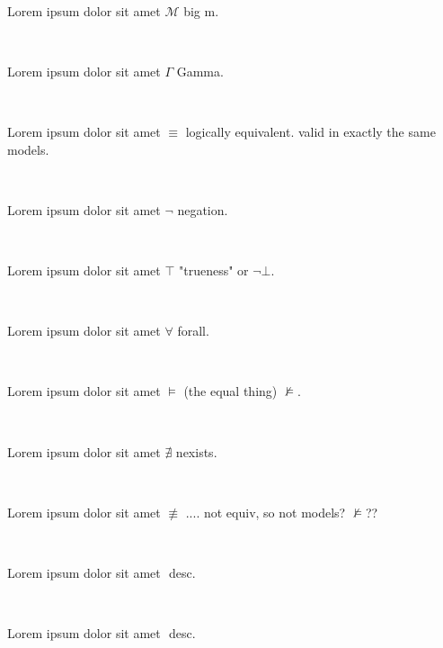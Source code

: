 \documentclass[12pt]{article}
\begin{document}
\centerline{~}

Lorem ipsum dolor sit amet $ \mathcal{M} $ big m.

\centerline{~}

Lorem ipsum dolor sit amet $ \Gamma $ Gamma.

\centerline{~}

Lorem ipsum dolor sit amet $ \equiv $ logically equivalent. valid in exactly the same models.

\centerline{~}

Lorem ipsum dolor sit amet $ \neg $ negation.

\centerline{~}

Lorem ipsum dolor sit amet $ \top $ "trueness" or $ \neg \bot $.

\centerline{~}

Lorem ipsum dolor sit amet $ \forall $ forall.

\centerline{~}

Lorem ipsum dolor sit amet $ \models $ (the equal thing) $ \nvDash $.

\centerline{~}

Lorem ipsum dolor sit amet $ \nexists $ nexists.

\centerline{~}

Lorem ipsum dolor sit amet $ \not\equiv $ .... not equiv, so not models? $ \not\models $??

\centerline{~}

Lorem ipsum dolor sit amet $  $ desc.

\centerline{~}

Lorem ipsum dolor sit amet $  $ desc.

\centerline{~}
\end{document}
